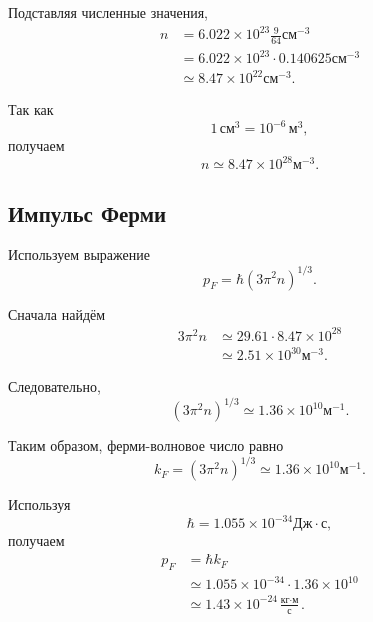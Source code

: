 \documentclass[../final.tex]{subfiles}
\begin{document}
Подставляя численные значения,
%
\begin{align*}
    n
    &=
    6.022\times10^{23}
    \frac{
        9
    }{
        64
    }
    \text{см}^{-3}
    \\[3pt]
    &=
    6.022\times10^{23}
    \cdot
    0.140625
    \text{см}^{-3}
    \\[3pt]
    &\simeq
    8.47\times10^{22}
    \text{см}^{-3}.
\end{align*}

Так как
%
\begin{equation*}
    1\,\text{см}^3
    =
    10^{-6}\,\text{м}^3,
\end{equation*}
%
получаем
%
\begin{equation*}
    \boxed{
        n
        \simeq
        8.47\times10^{28}
        \text{м}^{-3}
    }.
\end{equation*}



\subsection*{Импульс Ферми}

Используем выражение
%
\begin{equation*}
    p_F
    =
    \hbar
    (3\pi^2n)^{1/3}.
\end{equation*}

Сначала найдём
%
\begin{align*}
    3\pi^2n
    &\simeq
    29.61
    \cdot
    8.47\times10^{28}
    \\[3pt]
    &\simeq
    2.51\times10^{30}
    \text{м}^{-3}.
\end{align*}

Следовательно,
%
\begin{equation*}
    (3\pi^2n)^{1/3}
    \simeq
    1.36\times10^{10}
    \text{м}^{-1}.
\end{equation*}

Таким образом, ферми-волновое число равно
%
\begin{equation*}
    k_F
    =
    (3\pi^2n)^{1/3}
    \simeq
    1.36\times10^{10}
    \text{м}^{-1}.
\end{equation*}

Используя
%
\begin{equation*}
    \hbar
    =
    1.055\times10^{-34}
    \text{Дж}\cdot\text{с},
\end{equation*}
%
получаем
%
\begin{align*}
    p_F
    &=
    \hbar k_F
    \\[3pt]
    &\simeq
    1.055\times10^{-34}
    \cdot
    1.36\times10^{10}
    \\[3pt]
    &\simeq
    1.43\times10^{-24}
    \frac{
        \text{кг}\cdot\text{м}
    }{
        \text{с}
    }.
\end{align*}
\end{document}
